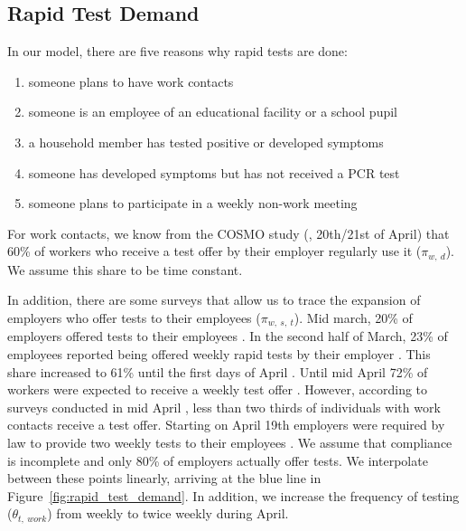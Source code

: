 \subsection{Rapid Test Demand}
\label{subsec:rapid_test_demand}

In our model, there are five reasons why rapid tests are done:

\begin{enumerate}
    \item someone plans to have work contacts
    \item someone is an employee of an educational facility or a school pupil
    \item a household member has tested positive or developed symptoms
    \item someone has developed symptoms but has not received a PCR test
    \item someone plans to participate in a weekly non-work meeting
\end{enumerate}


For work contacts, we know from the COSMO study (\cite{Betsch2021}, 20th/21st of April)
that 60\% of workers who receive a test offer by their employer regularly use it
($\pi_{w,\:d}$). We assume this share to be time constant.

In addition, there are some surveys that allow us to trace the expansion of employers who
offer tests to their employees ($\pi_{w,\:s,\:t}$). Mid march, 20\% of employers offered
tests to their employees \citep{DIHK2021}. In the second half of March, 23\% of employees
reported being offered weekly rapid tests by their employer \citep{Ahlers2021}. This
share increased to 61\% until the first days of April \citep{BMWI2021, IZA2021}. Until
mid April 72\% of workers were expected to receive a weekly test offer \citep{BMWI2021,
IZA2021}. However, according to surveys conducted in mid April \citep{Betsch2021}, less
than two thirds of individuals with work contacts receive a test offer. Starting on April
19th employers were required by law to provide two weekly tests to their employees
\citep{Bundesanzeiger2021}. We assume that compliance is incomplete and only 80\% of
employers actually offer tests. We interpolate between these points linearly, arriving at
the blue line in Figure~\ref{fig:rapid_test_demand}. In addition, we increase the
frequency of testing ($\theta_{t,\:work}$) from weekly to twice weekly during April.

